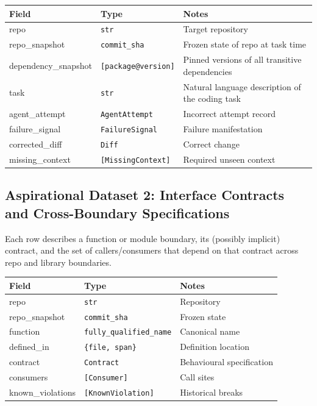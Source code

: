 \documentclass[a4paper,12pt]{article}
\begin{document}
\begin{tcolorbox}[title=Task]
\footnotesize
\begin{tabularx}{\linewidth}{@{} l l Y @{}}
\toprule
\textbf{Field} & \textbf{Type} & \textbf{Notes} \\
\midrule
repo & \texttt{str} & Target repository \\
repo\_snapshot & \texttt{commit\_sha} & Frozen state of repo at task time \\
dependency\_snapshot & \texttt{[package@version]} & Pinned versions of all transitive dependencies \\
task & \texttt{str} & Natural language description of the coding task \\
agent\_attempt & \texttt{AgentAttempt} & Incorrect attempt record \\
failure\_signal & \texttt{FailureSignal} & Failure manifestation \\
corrected\_diff & \texttt{Diff} & Correct change \\
missing\_context & \texttt{[MissingContext]} & Required unseen context \\
\bottomrule
\end{tabularx}
\end{tcolorbox}

\subsection*{Aspirational Dataset 2: Interface Contracts and Cross-Boundary Specifications}

\noindent Each row describes a function or module boundary, its (possibly implicit) contract, and the set of callers/consumers that depend on that contract across repo and library boundaries.

\begin{tcolorbox}[title=Function]
\footnotesize
\begin{tabularx}{\linewidth}{@{} l l Y @{}}
\toprule
\textbf{Field} & \textbf{Type} & \textbf{Notes} \\
\midrule
repo & \texttt{str} & Repository \\
repo\_snapshot & \texttt{commit\_sha} & Frozen state \\
function & \texttt{fully\_qualified\_name} & Canonical name \\
defined\_in & \texttt{\{file, span\}} & Definition location \\
contract & \texttt{Contract} & Behavioural specification \\
consumers & \texttt{[Consumer]} & Call sites \\
known\_violations & \texttt{[KnownViolation]} & Historical breaks \\
\bottomrule
\end{tabularx}
\end{tcolorbox}
\end{document}
